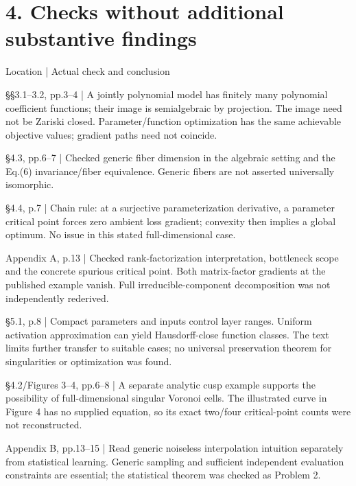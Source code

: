 \documentclass[10pt]{article}
\begin{document}
\section*{4. Checks without additional substantive findings}
Location | Actual check and conclusion\par
§§3.1–3.2, pp.3–4 | A jointly polynomial model has finitely many polynomial coefficient functions; their image is semialgebraic by projection. The image need not be Zariski closed. Parameter/function optimization has the same achievable objective values; gradient paths need not coincide.\par
§4.3, pp.6–7 | Checked generic fiber dimension in the algebraic setting and the Eq.(6) invariance/fiber equivalence. Generic fibers are not asserted universally isomorphic.\par
§4.4, p.7 | Chain rule: at a surjective parameterization derivative, a parameter critical point forces zero ambient loss gradient; convexity then implies a global optimum. No issue in this stated full-dimensional case.\par
Appendix A, p.13 | Checked rank-factorization interpretation, bottleneck scope and the concrete spurious critical point. Both matrix-factor gradients at the published example vanish. Full irreducible-component decomposition was not independently rederived.\par
§5.1, p.8 | Compact parameters and inputs control layer ranges. Uniform activation approximation can yield Hausdorff-close function classes. The text limits further transfer to suitable cases; no universal preservation theorem for singularities or optimization was found.\par
§4.2/Figures 3–4, pp.6–8 | A separate analytic cusp example supports the possibility of full-dimensional singular Voronoi cells. The illustrated curve in Figure 4 has no supplied equation, so its exact two/four critical-point counts were not reconstructed.\par
Appendix B, pp.13–15 | Read generic noiseless interpolation intuition separately from statistical learning. Generic sampling and sufficient independent evaluation constraints are essential; the statistical theorem was checked as Problem 2.\par
\end{document}
